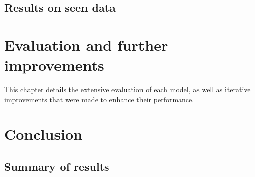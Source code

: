 \documentclass[12pt]{report}
\begin{document}
\section{Results on seen data}

\chapter{Evaluation and further improvements}
This chapter details the extensive evaluation of each model, as well as iterative improvements 
that were made to enhance their performance.


\chapter{Conclusion}





\section{Summary of results} 
\end{document}

